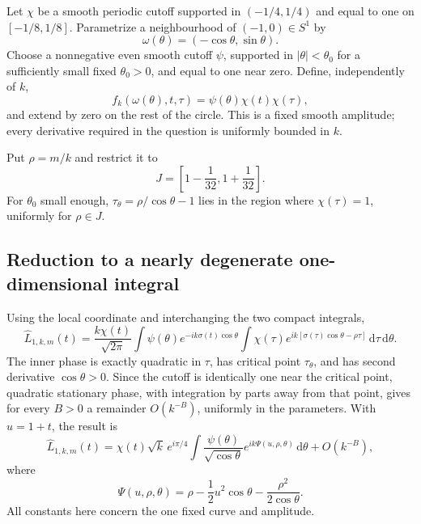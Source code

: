 \documentclass[11pt,a4paper]{article}
\theoremstyle{remark}
\newcommand{\dd}{\,\mathrm d}
\begin{document}
Let $\chi$ be a smooth periodic cutoff supported in $(-1/4,1/4)$ and equal to one on $[-1/8,1/8]$. Parametrize a neighbourhood of $(-1,0)\in S^1$ by
\[
 \omega(\theta)=(-\cos\theta,\sin\theta).
\]
Choose a nonnegative even smooth cutoff $\psi$, supported in $|\theta|<\theta_0$ for a sufficiently small fixed $\theta_0>0$, and equal to one near zero. Define, independently of $k$,
\begin{equation}\label{eq:amp}
 f_k(\omega(\theta),t,\tau)=\psi(\theta)\chi(t)\chi(\tau),
\end{equation}
and extend by zero on the rest of the circle. This is a fixed smooth amplitude; every derivative required in the question is uniformly bounded in $k$.

Put $\rho=m/k$ and restrict it to
\[
 J=\left[1-\frac1{32},1+\frac1{32}\right].
\]
For $\theta_0$ small enough, $\tau_\theta=\rho/\cos\theta-1$ lies in the region where $\chi(\tau)=1$, uniformly for $\rho\in J$.

\subsection{Reduction to a nearly degenerate one-dimensional integral}

Using the local coordinate and interchanging the two compact integrals,
\begin{equation}\label{eq:Lhat}
 \widehat L_{1,k,m}(t)=\frac{k\chi(t)}{\sqrt{2\pi}}
 \int\psi(\theta)e^{-ik\sigma(t)\cos\theta}
 \int\chi(\tau)e^{ik[\sigma(\tau)\cos\theta-\rho\tau]}
 \dd\tau\dd\theta.
\end{equation}
The inner phase is exactly quadratic in $\tau$, has critical point $\tau_\theta$, and has second derivative $\cos\theta>0$. Since the cutoff is identically one near the critical point, quadratic stationary phase, with integration by parts away from that point, gives for every $B>0$ a remainder $O(k^{-B})$, uniformly in the parameters. With $u=1+t$, the result is
\begin{equation}\label{eq:stationtau}
 \widehat L_{1,k,m}(t)=\chi(t)\sqrt{k}\,e^{i\pi/4}
 \int \frac{\psi(\theta)}{\sqrt{\cos\theta}}
 e^{ik\Psi(u,\rho,\theta)}\dd\theta+O(k^{-B}),
\end{equation}
where
\begin{equation}\label{eq:Psi}
 \Psi(u,\rho,\theta)=\rho-\frac12u^2\cos\theta
 -\frac{\rho^2}{2\cos\theta}.
\end{equation}
All constants here concern the one fixed curve and amplitude.
\end{document}
